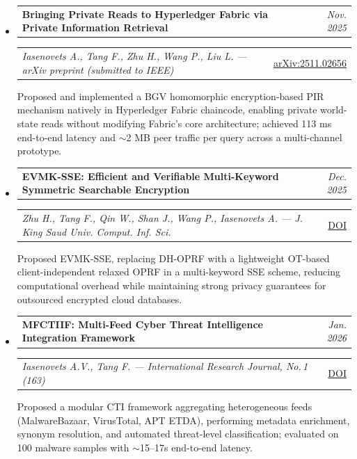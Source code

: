 \documentclass[11pt,letterpaper]{article}
\makeatletter
\newcommand{\headerrow}[2]
{\begin{tabular*}{\linewidth}{l@{\extracolsep{\fill}}r}
#1 & #2 \\
\end{tabular*}}
\makeatother
\begin{document}
\begin{itemize}[leftmargin=0em, itemsep=0.5em]
    \parskip=0.1em
    \renewcommand\labelitemi{}

    \item
    \headerrow
        {\textbf{Bringing Private Reads to Hyperledger Fabric via Private Information Retrieval}}
        {\emph{Nov. 2025}}
    \headerrow
        {\emph{Iasenovets A., Tang F., Zhu H., Wang P., Liu L. --- arXiv preprint (submitted to IEEE)}}
        {\href{https://arxiv.org/abs/2511.02656}{arXiv:2511.02656}}
    \vspace{0.1em}
    {\small Proposed and implemented a BGV homomorphic encryption-based PIR mechanism natively in Hyperledger Fabric chaincode, enabling private world-state reads without modifying Fabric's core architecture; achieved 113 ms end-to-end latency and $\sim$2 MB peer traffic per query across a multi-channel prototype.}

    \item
    \headerrow
        {\textbf{EVMK-SSE: Efficient and Verifiable Multi-Keyword Symmetric Searchable Encryption}}
        {\emph{Dec. 2025}}
    \headerrow
        {\emph{Zhu H., Tang F., Qin W., Shan J., Wang P., Iasenovets A. --- J. King Saud Univ. Comput. Inf. Sci.}}
        {\href{https://doi.org/10.1007/s44443-025-00405-8}{DOI}}
    \vspace{0.1em}
    {\small Proposed EVMK-SSE, replacing DH-OPRF with a lightweight OT-based client-independent relaxed OPRF in a multi-keyword SSE scheme, reducing computational overhead while maintaining strong privacy guarantees for outsourced encrypted cloud databases.}

    \item
    \headerrow
        {\textbf{MFCTIIF: Multi-Feed Cyber Threat Intelligence Integration Framework}}
        {\emph{Jan. 2026}}
    \headerrow
        {\emph{Iasenovets A.V., Tang F. --- International Research Journal, No.\,1 (163)}}
        {\href{https://doi.org/10.60797/IRJ.2026.163.57}{DOI}}
    \vspace{0.1em}
    {\small Proposed a modular CTI framework aggregating heterogeneous feeds (MalwareBazaar, VirusTotal, APT ETDA), performing metadata enrichment, synonym resolution, and automated threat-level classification; evaluated on 100 malware samples with $\sim$15--17s end-to-end latency.}

\end{itemize}

\vspace{0.2cm}
\end{document}
